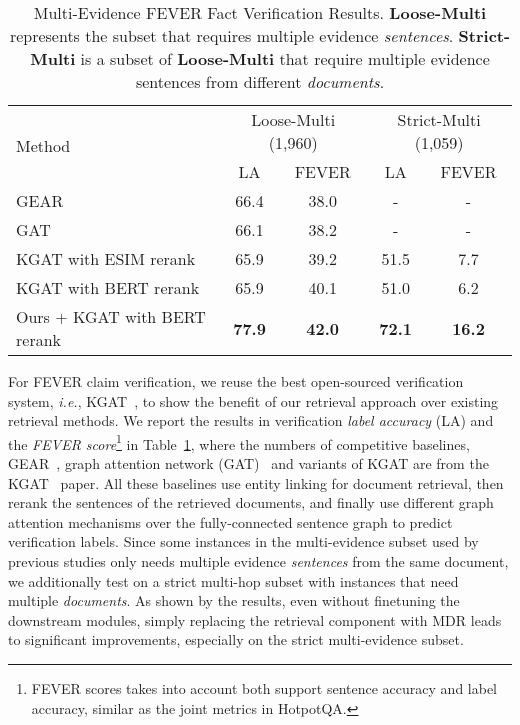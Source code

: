 \documentclass{article} \usepackage{iclr2021_conference,times}
\newcommand{\method}{MDR\xspace}
\begin{document}
\begin{table}[t]
    \centering
    \small
    \vspace{-0.2in}
    \caption{Multi-Evidence FEVER Fact Verification Results. \textbf{Loose-Multi} represents the subset that requires multiple evidence \textit{sentences}. \textbf{Strict-Multi} is a subset of \textbf{Loose-Multi} that require multiple evidence sentences from different \textit{documents}.}
    \begin{tabular}{l|cccc}
        \toprule
      \multirow{2}{*}{Method} &  \multicolumn{2}{c}{Loose-Multi (1,960)} &  \multicolumn{2}{c}{Strict-Multi (1,059)} \\
      & LA & FEVER & LA & FEVER \\
        \midrule
       GEAR & 66.4 & 38.0 & - & - \\
       GAT & 66.1 & 38.2 & - & -\\
       KGAT with ESIM rerank & 65.9 & 39.2 & 51.5 & 7.7\\
       KGAT with BERT rerank & 65.9 & 40.1 & 51.0 & 6.2 \\
       \midrule
       Ours + KGAT with BERT rerank  & \textbf{77.9} & \textbf{42.0} & \textbf{72.1} & \textbf{16.2}\\
        \bottomrule
    \end{tabular}
    \label{tab:fever_final}
    \vspace{-0.15in}
\end{table} 
For FEVER claim verification, we reuse the best open-sourced verification system, \emph{i.e.}, KGAT~\citep{KGAT}, to show the benefit of our retrieval approach over existing retrieval methods. 
We report the results in verification \emph{label accuracy} (LA) and the \emph{FEVER score}\footnote{FEVER scores takes into account both support sentence accuracy and label accuracy, similar as the joint metrics in HotpotQA.} in Table~\ref{tab:fever_final}, where the numbers of competitive baselines, GEAR~\citep{GEAR}, graph attention network (GAT)~\citep{GAT} and variants of KGAT
are from the KGAT~\citep{KGAT} paper.
All these baselines use entity linking for document retrieval, then rerank the sentences of the retrieved documents, and finally use different graph attention mechanisms over the fully-connected sentence graph to predict verification labels.
Since some instances in the multi-evidence subset used by previous studies only needs multiple evidence \textit{sentences} from the same document, we additionally test on a strict multi-hop subset with instances that need multiple \textit{documents}.
As shown by the results, even without finetuning the downstream modules, simply replacing the retrieval component with \method leads to significant improvements, especially on the strict multi-evidence subset.
\end{document}
